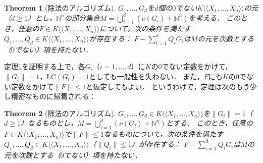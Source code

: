 \documentclass[a4paper,12pt, dvipdfmx]{jsbook}
\def\N{\mathbb{N}}
\def\dl{\langle\!\langle}
\def\dr{\rangle\!\rangle}
\def\LC{\mathrm{LC}}
\newcommand{\abss}[1]{\|#1\|}
\theoremstyle{plain}
\newtheorem{thm}{\bfseries Theorem}[section]
\theoremstyle{definition}
\begin{document}
\begin{thm}[除法のアルゴリズム]\label{thm-divisionalgorithm}{\rm 
$G_1,\ldots,G_d$を$d$個の$0$でない$K\dl X_1,\ldots,X_n\dr$の元（$d\geq 1$）とし，$\N^n$の部分集合$M=\bigcup^d_{i=1}(\nu(G_i)+\N^n)$を考える．
このとき，任意の$F\in K\dl X_1,\ldots,X_n\dr$について，次の条件を満たす$Q_1,\ldots,Q_d\in K\dl X_1,\ldots,X_n\dr$が存在する：
$F-\sum^d_{i=1}Q_iG_i$は$M$の元を次数とする（$0$でない）項を持たない．}
\end{thm}

定理\ref{thm-divisionalgorithm}を証明する上で，各$G_i$（$i=1,\ldots,d$）に$K$の$0$でない定数をかけて，$\abss{G_i}=1$，$\LC(G_i)=1$としても一般性を失わない．
また，$F$にも$K$の$0$でない定数をかけて$\abss{F}\leq 1$と仮定してもよい．
というわけで，定理は次のもう少し精密なものに帰着される：

\begin{thm}[除法のアルゴリズム]\label{thm-divisionalgorithmint}{\rm 
$G_1,\ldots,G_d\in K\dl X_1,\ldots,X_n\dr$を$\abss{G_i}=1$（$d\geq 1$）なるものとし，$M=\bigcup^d_{i=1}(\nu(G_i)+\N^n)$とする．
このとき，任意の$F\in K\dl X_1,\ldots,X_n\dr$で$\abss{F}\leq 1$なるものについて，次の条件を満たす$Q_1,\ldots,Q_d\in K\dl X_1,\ldots,X_n\dr$（$\abss{Q_i}\leq 1$）が存在する：
$F-\sum^d_{i=1}Q_iG_i$は$M$の元を次数とする（$0$でない）項を持たない．}
\end{thm}
\end{document}
